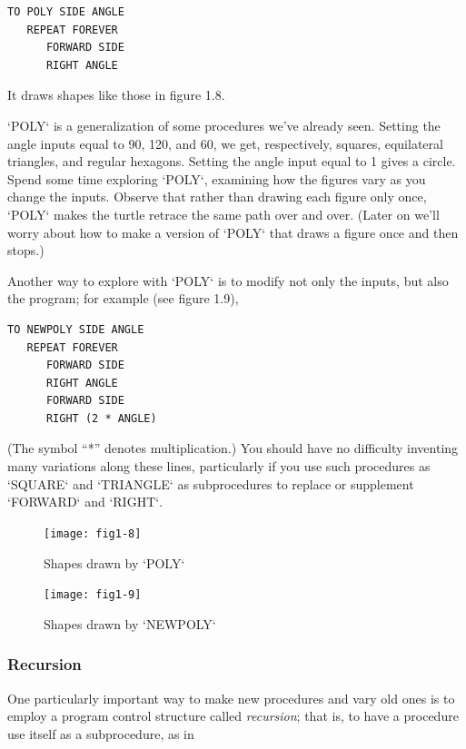 \documentclass{book}
\begin{document}
\begin{verbatim}
TO POLY SIDE ANGLE
   REPEAT FOREVER
      FORWARD SIDE
      RIGHT ANGLE
\end{verbatim}
It draws shapes like those in figure 1.8.

\textsc{`POLY`} is a generalization of some procedures we've already seen. Setting
the angle inputs equal to 90, 120, and 60, we get, respectively, squares,
equilateral triangles, and regular hexagons. Setting the angle input equal
to 1 gives a circle. Spend some time exploring \textsc{`POLY`}, examining how the
figures vary as you change the inputs. Observe that rather than drawing
each figure only once, \textsc{`POLY`} makes the turtle retrace the same path over
and over. (Later on we'll worry about how to make a version of \textsc{`POLY`}
that draws a figure once and then stops.)

Another way to explore with \textsc{`POLY`} is to modify not only the inputs,
but also the program; for example (see figure 1.9),

\begin{verbatim}
TO NEWPOLY SIDE ANGLE
   REPEAT FOREVER
      FORWARD SIDE
      RIGHT ANGLE
      FORWARD SIDE
      RIGHT (2 * ANGLE)
\end{verbatim}
(The symbol ``*'' denotes multiplication.) You should have no difficulty
inventing many variations along these lines, particularly if you use such
procedures as \textsc{`SQUARE`} and \textsc{`TRIANGLE`} as subprocedures to 
replace or supplement \textsc{`FORWARD`} and \textsc{`RIGHT`}.

\begin{figure}
\begin{center}
\texttt{[image: fig1-8]}
\caption{Shapes drawn by \textsc{`POLY`}}
\end{center}
\end{figure}

\begin{figure}
\begin{center}
\texttt{[image: fig1-9]}
\caption{Shapes drawn by \textsc{`NEWPOLY`}}
\end{center}
\end{figure}

\subsubsection{Recursion}

One particularly important way to make new procedures and vary old
ones is to employ a program control structure called {\em recursion}; that is,
to have a procedure use itself as a subprocedure, as in
\end{document}

